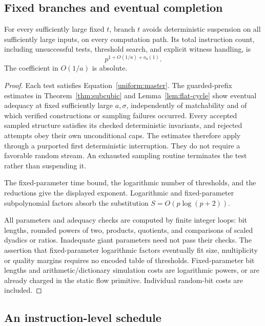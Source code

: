 \subsection{Fixed branches and eventual completion}

\begin{lemma}\label{uniform:fixed-branch}
For every sufficiently large fixed $t$, branch $t$ avoids deterministic
suspension on all sufficiently large inputs, on every computation path.
Its total instruction count, including unsuccessful tests, threshold
search, and explicit witness handling, is
\[
                          p^{1+O(1/a)+o_a(1)}.
\]
The coefficient in $O(1/a)$ is absolute.
\end{lemma}

\begin{proof}
Each test satisfies Equation~\eqref{uniform:master}. The guarded-prefix
estimates in Theorem~\ref{thm:subcubic} and Lemma~\ref{lem:flat-cycle}
show eventual adequacy at fixed sufficiently large $a,\sigma$, independently
of matchability and of which verified constructions or sampling failures
occurred. Every accepted sampled structure satisfies its checked
deterministic invariants, and rejected attempts obey their own unconditional caps.
The estimates therefore apply through a purported first deterministic
interruption. They do not require a favorable random stream. An exhausted
sampling routine terminates the test rather than suspending it.

The fixed-parameter time bound, the logarithmic number of thresholds,
and the reductions give the displayed exponent. Logarithmic and
fixed-parameter subpolynomial factors absorb the substitution
$S=O(p\log(p+2))$.

All parameters and adequacy checks are computed by finite integer loops:
bit lengths, rounded powers of two, products, quotients, and comparisons
of scaled dyadics or ratios. Inadequate giant parameters need not pass
their checks. The assertion that fixed-parameter logarithmic factors
eventually fit size, multiplicity or quality margins requires no encoded
table of thresholds. Fixed-parameter bit lengths and arithmetic/dictionary
simulation costs are logarithmic powers, or are already charged in the
static flow primitive. Individual random-bit costs are included.
\end{proof}

\subsection{An instruction-level schedule}

